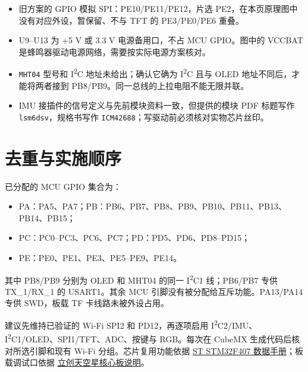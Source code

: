 \documentclass[UTF8,10pt,a4paper,fontset=fandol]{ctexart}
\begin{document}
\begin{itemize}
\item 旧方案的 GPIO 模拟 SPI：PE10/PE11/PE12，片选 PE2，在本页原理图中没有对应外设，暂保留、不与 TFT 的 PE3/PE0/PE6 重叠。
\item U9--U13 为 +5 V 或 3.3 V 电源备用口，不占 MCU GPIO。图中的 VCCBAT 是蜂鸣器驱动电源网络，需要按实际电源方案核对。
\item \texttt{MHT04} 型号和 I\textsuperscript{2}C 地址未给出；确认它确为 I\textsuperscript{2}C 且与 OLED 地址不同后，才能将两者接到 PB8/PB9。同一总线的上拉电阻不能无限并联。
\item IMU 接插件的信号定义与先前模块资料一致，但提供的模块 PDF 标题写作 \texttt{lsm6dsv}，规格书写作 \texttt{ICM42688}；写驱动前必须核对实物芯片丝印。
\end{itemize}

\section{去重与实施顺序}
已分配的 MCU GPIO 集合为：
\begin{itemize}
\item PA：PA5、PA7；PB：PB6、PB7、PB8、PB9、PB10、PB11、PB13、PB14、PB15；
\item PC：PC0--PC3、PC6、PC7；PD：PD5、PD6、PD8--PD15；
\item PE：PE0、PE1、PE3、PE5--PE9、PE14。
\end{itemize}
其中 PB8/PB9 分别为 OLED 和 MHT04 的同一 I\textsuperscript{2}C1 线；PB6/PB7 专供 TX\_1/RX\_1 的 USART1。其余 MCU 引脚没有被分配给互斥功能。PA13/PA14 专供 SWD，板载 TF 卡线路未被外设占用。

建议先维持已验证的 Wi-Fi SPI2 和 PD12，再逐项启用 I\textsuperscript{2}C2/IMU、I\textsuperscript{2}C1/OLED、SPI1/TFT、ADC、按键与 RGB。每次在 CubeMX 生成代码后核对所选引脚和现有 Wi-Fi 分组。芯片复用功能依据 \href{https://www.st.com/resource/en/datasheet/stm32f407ve.pdf}{ST STM32F407 数据手册}；板载调试口依据 \href{https://wiki.lckfb.com/zh-hans/fdb/basic/rec-gpio.html}{立创天空星核心板说明}。
\end{document}
